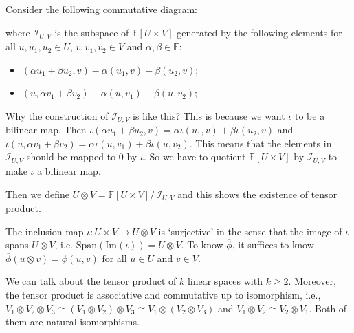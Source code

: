 \documentclass[
	11pt, %
	fleqn, %
	a4paper, %
]{LegrandOrangeBook}
\renewcommand{\Im}[1]{\text{Im}(#1)} %
\renewcommand{\span}[1]{\text{Span}(#1)} %
\renewcommand{\bar}[1]{\overline{#1}} %
\newcommand{\quotient}[2]{#1 /\, #2} %
\newcommand{\F}{\mathbb{F}} %
\begin{document}
Consider the following commutative diagram:
\begin{center}
\end{center}
where $\mathcal{I}_{U, V}$ is the subspace of $\F[U \times V]$ generated by the following elements for all $u, u_1, u_2 \in U$, $v, v_1, v_2 \in V$ and $\alpha, \beta \in \F$:
\begin{itemize}
    \item $(\alpha u_1 + \beta u_2, v) - \alpha (u_1, v) - \beta (u_2, v)$;
    \item $(u, \alpha v_1 + \beta v_2) - \alpha (u, v_1) - \beta (u, v_2)$;
\end{itemize}
Why the construction of $\mathcal{I}_{U, V}$ is like this? This is because we want $\iota$ to be a bilinear map. Then $\iota(\alpha u_1 + \beta u_2, v) = \alpha \iota(u_1, v) + \beta \iota(u_2, v)$ and $\iota(u, \alpha v_1 + \beta v_2) = \alpha \iota(u, v_1) + \beta \iota(u, v_2)$. This means that the elements in $\mathcal{I}_{U, V}$ should be mapped to $0$ by $\iota$. So we have to quotient $\F[U \times V]$ by $\mathcal{I}_{U, V}$ to make $\iota$ a bilinear map.

Then we define $U \otimes V = \quotient{\F[U \times V]}{\mathcal{I}_{U, V}}$ and this shows the existence of tensor product.

\begin{remark}
    The inclusion map $\iota : U \times V \to U \otimes V$ is `surjective' in the sense that the image of $\iota$ spans $U \otimes V$, i.e. $\span{\Im{\iota}} = U \otimes V$. To know $\bar{\phi}$, it suffices to know $\bar{\phi}(u \otimes v) = \phi(u, v)$ for all $u \in U$ and $v \in V$.
\end{remark}

We can talk about the tensor product of $k$ linear spaces with $k \geq 2$. Moreover, the tensor product is associative and commutative up to isomorphism, i.e., $V_1 \otimes V_2 \otimes V_3 \cong (V_1 \otimes V_2) \otimes V_3 \cong V_1 \otimes (V_2 \otimes V_3)$ and $V_1 \otimes V_2 \cong V_2 \otimes V_1$. Both of them are natural isomorphisms.
\end{document}
